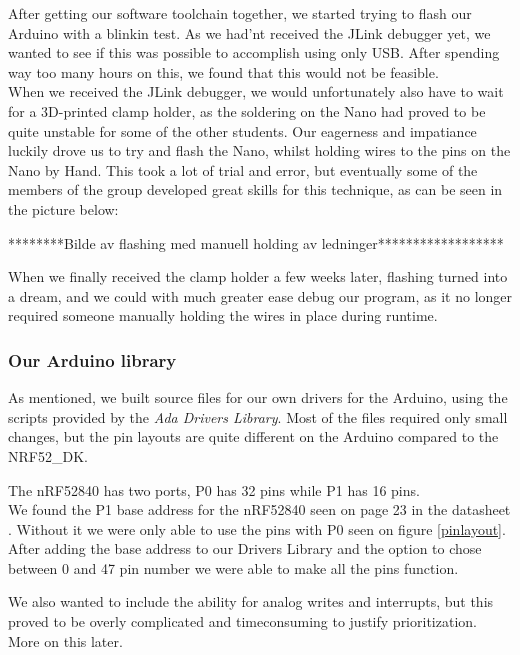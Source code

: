 \documentclass{article}
\begin{document}
After getting our software toolchain together, we started trying to flash our Arduino with a blinkin test. As we had'nt received the JLink debugger yet, we wanted to see if this was possible to accomplish using only USB. After spending way too many hours on this, we found that this would not be feasible.\\ 

When we received the JLink debugger, we would unfortunately also have to wait for a 3D-printed clamp holder, as the soldering on the Nano had proved to be quite unstable for some of the other students. Our eagerness and impatiance luckily drove us to try and flash the Nano, whilst holding wires to the pins on the Nano by Hand. This took a lot of trial and error, but eventually some of the members of the group developed great skills for this technique, as can be seen in the picture below:

********Bilde av flashing med manuell holding av ledninger******************

When we finally received the clamp holder a few weeks later, flashing turned into a dream, and we could with much greater ease debug our program, as it no longer required someone manually holding the wires in place during runtime. 


\subsubsection{Our Arduino library}

As mentioned, we built source files for our own drivers for the Arduino, using the scripts provided by the \textit{Ada Drivers Library}. Most of the files required only small changes, but the pin layouts are quite different on the Arduino compared to the NRF52\_DK. 

The nRF52840 has two ports, P0 has 32 pins while P1 has 16 pins.\\ 
We found the P1 base address for the nRF52840 seen on page 23 in the datasheet \cite{NRF52840}. Without it we were only able to use the pins with P0 seen on figure \ref{pinlayout}. After adding the base address to our Drivers Library and the option to chose between 0 and 47 pin number we were able to make all the pins function.

We also wanted to include the ability for analog writes and interrupts, but this proved to be overly complicated and timeconsuming to justify prioritization. More on this later. 
\end{document}
